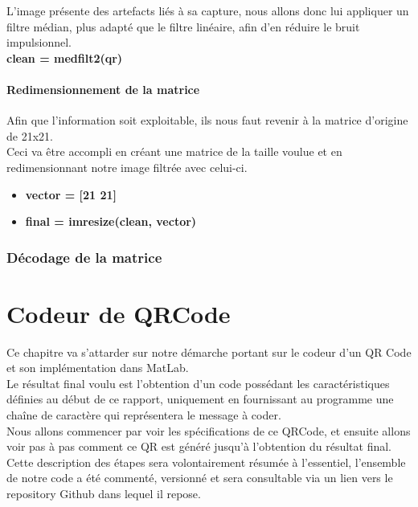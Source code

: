 \documentclass{report}
\begin{document}
				L'image présente des artefacts liés à sa capture, nous allons donc lui appliquer un filtre médian, plus adapté que le filtre linéaire, afin d'en réduire le bruit impulsionnel.\\

				\textbf{clean = medfilt2(qr)}

			\subsubsection{Redimensionnement de la matrice}

				Afin que l'information soit exploitable, ils nous faut revenir à la matrice d'origine de 21x21.\\
				Ceci va être accompli en créant une matrice de la taille voulue et en redimensionnant notre image filtrée avec celui-ci.\\

				\begin{itemize}
					\item \textbf{vector = [21 21]}
					\item \textbf{final = imresize(clean, vector)}
				\end{itemize}


		\subsection{Décodage de la matrice}


\chapter{Codeur de QRCode}
	
	Ce chapitre va s'attarder sur notre démarche portant sur le codeur d'un QR Code et son implémentation dans MatLab.\\
	Le résultat final voulu est l'obtention d'un code possédant les caractéristiques définies au début de ce rapport, uniquement en fournissant au programme une chaîne de caractère qui représentera le message à coder.\\

	Nous allons commencer par voir les spécifications de ce QRCode, et ensuite allons voir pas à pas comment ce QR est généré jusqu'à l'obtention du résultat final.\\

	Cette description des étapes sera volontairement résumée à l'essentiel, l'ensemble de notre code a été commenté, versionné et sera consultable via un lien vers le repository Github dans lequel il repose.\\
\end{document}
